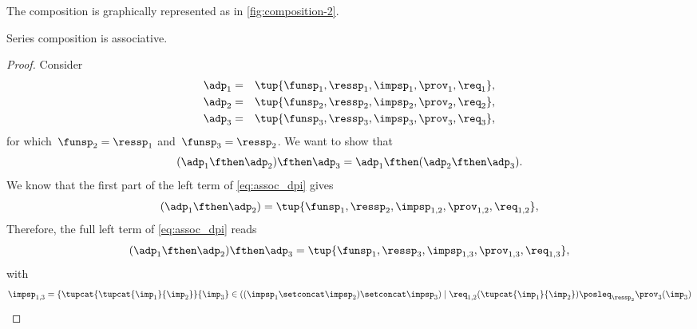 The composition is graphically represented as in \cref{fig:composition-2}.

\begin{marginfigure}
    \label{fig:composition-2}
    \begin{center}
    \end{center}
\end{marginfigure}


\begin{lemma}
    Series composition is associative.
\end{lemma}
\begin{proof}
    Consider
    \begin{equation}
        \begin{aligned}
            \adp_{1}&=&\tup{\funsp_{1},\ressp_{1},\impsp_{1},\prov_{1},\req_{1}},\\
            \adp_{2}&=&\tup{\funsp_{2},\ressp_{2},\impsp_{2},\prov_{2},\req_{2}},\\
            \adp_{3}&=&\tup{\funsp_{3},\ressp_{3},\impsp_{3},\prov_{3},\req_{3}},
        \end{aligned}
    \end{equation}
    for which~$\funsp_{2}=\ressp_{1}$ and~$\funsp_{3}=\ressp_{2}$. We want to show that
    \begin{equation}
        \label{eq:assoc_dpi}
        (\adp_1\fthen \adp_2)\fthen \adp_3=\adp_1\fthen (\adp_2\fthen \adp_3).
    \end{equation}
    We know that the first part of the left term of \cref{eq:assoc_dpi} gives
    \begin{equation}
    (\adp_{1} \fthen \adp_{2})
        =
        \tup{ \funsp_{1},\ressp_{2},\impsp_{1,2},\prov_{1,2},\req_{1,2}},
    \end{equation}
    Therefore, the full left term of \cref{eq:assoc_dpi} reads
    \begin{equation}
        \label{eq:dpi_ass_1}
        (\adp_{1} \fthen \adp_{2})\fthen \adp_{3}=\tup{ \funsp_{1},\ressp_{3},\impsp_{1,3},\prov_{1,3},\req_{1,3}},
    \end{equation}
    with
    \begin{equation}
        \begin{aligned}
            \impsp_{1,3}  &=  \{  \tupcat {\tupcat {\imp_{1}} {\imp_{2}}} {\imp_{3}} \in ((\impsp_{1} \setconcat \impsp_{2})\setconcat \impsp_{3})\mid\req_{1,2}(\tupcat {\imp_{1}} {\imp_{2}})\posleq_{\ressp_{2}}\prov_{3}(\imp_{3})
            \\

\end{aligned}
\end{equation}
\end{proof}
